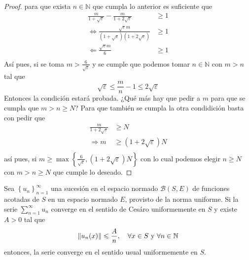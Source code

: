 \documentclass[12pt]{report}
\theoremstyle{largebreak}
\renewcommand{\leq}{\ensuremath{\leqslant}}
\renewcommand{\geq}{\ensuremath{\geqslant}}
\newcommand\norm[1]{\ensuremath{\|#1\|}}
\begin{document}
\begin{proof}
        para que exista $n\in\mathbb{N}$ que cumpla lo anterior es suficiente que
        \begin{equation*}
            \begin{split}
                \frac{m}{1+\sqrt{\varepsilon}}-\frac{m}{1+2\sqrt{\varepsilon}}&\geq 1\\
                \iff \frac{\sqrt{\varepsilon}m}{(1+\sqrt{\varepsilon})(1+2\sqrt{\varepsilon})}&\geq 1\\
                \Leftarrow \frac{\sqrt{\varepsilon}m}{6}&\geq 1\\
            \end{split}
        \end{equation*}
        Así pues, si se toma $m>\frac{6}{\sqrt{\varepsilon}}$ y se cumple que podemos tomar $n\in\mathbb{N}$ con $m>n$ tal que
        \begin{equation*}
            \sqrt{\varepsilon}\leq\frac{m}{n}-1\leq2\sqrt{\varepsilon}
        \end{equation*}
        Entonces la condición estará probada. ¿Qué más hay que pedir a $m$ para que se cumpla que $m>n\geq N$? Para que también se cumpla la otra condidición basta con pedir que 
        \begin{equation*}
            \begin{split}
                \frac{m}{1+2\sqrt{\varepsilon}}&\geq N\\
                \Rightarrow m&\geq(1+2\sqrt{\varepsilon})N\\
            \end{split}
        \end{equation*}
        así pues, si $m\geq\max\left\{\frac{6}{\sqrt{\varepsilon}},(1+2\sqrt{\varepsilon})N \right\}$ con lo cual podemos elegir $n\geq N$ con $m>n\geq N$ que cumple lo deseado.
    \end{proof}

    \begin{cor}
        Sea $\left\{u_n \right\}_{ n=1}^\infty$ una sucesión en el espacio normado $\mathcal{B}(S,E)$ de funciones acotadas de $S$ en un espacio normado $E$, provisto de la norma uniforme. Si la serie $\sum_{ n=1}^\infty u_n$ converge en el sentido de Cesáro uniformemente en $S$ y existe $A>0$ tal que
        \begin{equation*}
            \norm{u_n(x)}\leq\frac{A}{n},\quad\forall x\in S \textup{ y }\forall n\in\mathbb{N}
        \end{equation*}
        entonces, la serie converge en el sentido usual uniformemente en $S$.
    \end{cor}
\end{document}
